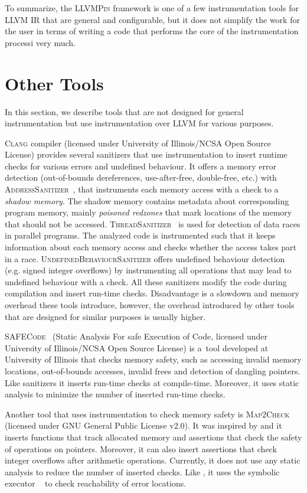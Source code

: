 To summarize, the \textsc{LLVMPin} framework is one of a few instrumentation
tools for LLVM IR that are general and configurable, but it does not simplify
the work for the user in terms of writing a code that performs the core of the
instrumentation processi very much.

\section{Other Tools}

In this section, we describe tools that are not designed for general
instrumentation but use instrumentation over LLVM for various purposes.

\textsc{Clang} compiler (licensed under University of Illinois/NCSA Open Source
License) provides several sanitizers that use instrumentation to insert runtime
checks for various errors and undefined behaviour. It offers a memory error
detection (out-of-bounds dereferences, use-after-free, double-free, etc.) with
\textsc{AddressSanitizer}~\cite{asan}, that instruments each memory access with
a check to a \textit{shadow memory}. The shadow memory contains metadata about
corresponding program memory, mainly \textit{poisoned redzones} that mark
locations of the memory that should not be accessed.
\textsc{ThreadSanitizer}~\cite{tsan} is used for detection of data races in
parallel programs. The analyzed code is instrumented such that it keeps
information about each memory access and checks whether the access takes part
in a race.  \textsc{UndefinedBehaviourSanitizer} offers undefined behaviour
detection (e.g. signed integer overflows) by instrumenting all operations that may
lead to undefined behaviour with a check. All these sanitizers modify the code
during compilation and insert run-time checks. Disadvantage is a slowdown and
memory overhead these tools introduce, however, the overhead introduced by other
tools that are designed for similar purposes is usually higher.

\textsc{SAFECode}~\cite{safecode} (Static Analysis For safe Execution of Code,
licensed under University of Illinois/NCSA Open Source License) is a~tool
developed at University of Illinois that checks memory safety, such as
accessing invalid memory locations, out-of-bounds accesses, invalid frees and
detection of dangling pointers. Like \clang sanitizers it inserts run-time
checks at compile-time. Moreover, it uses static analysis to minimize the
number of inserted run-time checks.

Another tool that uses instrumentation to check memory safety is
\textsc{Map2Check}~\cite{map2check} (licensed under GNU General Public License
v2.0). It was inspired by \symbiotic and it inserts functions that track
allocated memory and assertions that check the safety of operations on
pointers.  Moreover, it can also insert assertions that check integer overflows
after arithmetic operations.  Currently, it does not use any static analysis to
reduce the number of inserted checks. Like \symbiotic, it uses the symbolic
executor \klee~\cite{klee} to check reachability of error locations.

